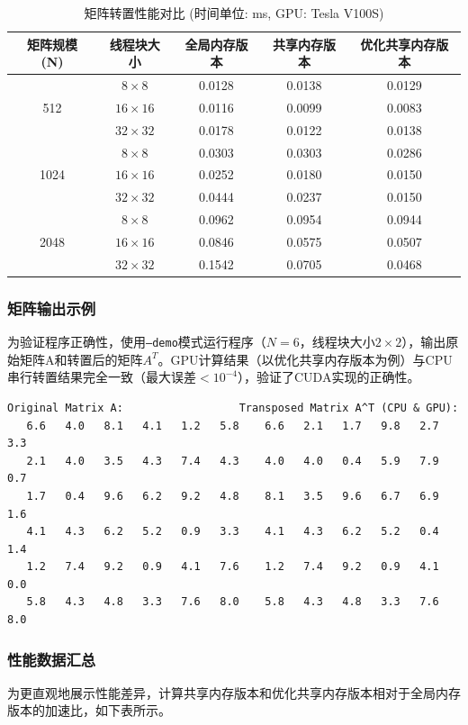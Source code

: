 \documentclass{SYSUReport}
\begin{document}
\begin{table}[h!]
\centering
\caption{矩阵转置性能对比 (时间单位: ms, GPU: Tesla V100S)}
\begin{tabular}{|c|c|c|c|c|}
\hline
矩阵规模 (N) & 线程块大小 & 全局内存版本 & 共享内存版本 & 优化共享内存版本 \\
\hline
\multirow{3}{*}{512} & $8\times8$ & 0.0128 & 0.0138 & 0.0129 \\
\cline{2-5}
& $16\times16$ & 0.0116 & 0.0099 & 0.0083 \\
\cline{2-5}
& $32\times32$ & 0.0178 & 0.0122 & 0.0138 \\
\hline
\multirow{3}{*}{1024} & $8\times8$ & 0.0303 & 0.0303 & 0.0286 \\
\cline{2-5}
& $16\times16$ & 0.0252 & 0.0180 & 0.0150 \\
\cline{2-5}
& $32\times32$ & 0.0444 & 0.0237 & 0.0150 \\
\hline
\multirow{3}{*}{2048} & $8\times8$ & 0.0962 & 0.0954 & 0.0944 \\
\cline{2-5}
& $16\times16$ & 0.0846 & 0.0575 & 0.0507 \\
\cline{2-5}
& $32\times32$ & 0.1542 & 0.0705 & 0.0468 \\
\hline
\end{tabular}
\end{table}

\newpage
\subsubsection{矩阵输出示例}
为验证程序正确性，使用\texttt{--demo}模式运行程序（$N=6$，线程块大小$2\times2$），输出原始矩阵A和转置后的矩阵$A^T$。GPU计算结果（以优化共享内存版本为例）与CPU串行转置结果完全一致（最大误差$<10^{-4}$），验证了CUDA实现的正确性。

\begin{verbatim}
Original Matrix A:                  Transposed Matrix A^T (CPU & GPU):
   6.6   4.0   8.1   4.1   1.2   5.8    6.6   2.1   1.7   9.8   2.7   3.3
   2.1   4.0   3.5   4.3   7.4   4.3    4.0   4.0   0.4   5.9   7.9   0.7
   1.7   0.4   9.6   6.2   9.2   4.8    8.1   3.5   9.6   6.7   6.9   1.6
   4.1   4.3   6.2   5.2   0.9   3.3    4.1   4.3   6.2   5.2   0.4   1.4
   1.2   7.4   9.2   0.9   4.1   7.6    1.2   7.4   9.2   0.9   4.1   0.0
   5.8   4.3   4.8   3.3   7.6   8.0    5.8   4.3   4.8   3.3   7.6   8.0
\end{verbatim}

\subsubsection{性能数据汇总}
为更直观地展示性能差异，计算共享内存版本和优化共享内存版本相对于全局内存版本的加速比，如下表所示。
\end{document}
